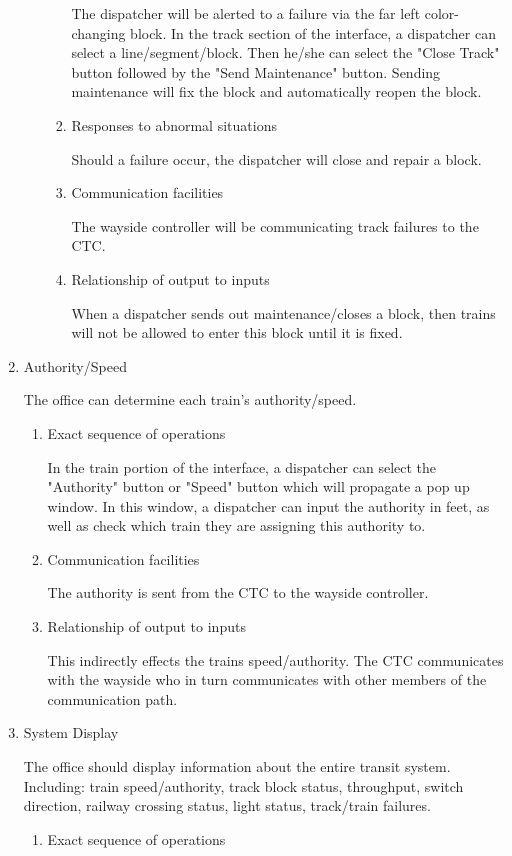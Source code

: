 \documentclass[11pt]{article}
\begin{document}
\begin{enumerate}
\begin{enumerate}
\begin{enumerate}
The dispatcher will be alerted to a failure via the far left color-changing block. In the track section of the interface, a dispatcher can select a line/segment/block. Then he/she can select the "Close Track" button followed by the "Send Maintenance" button. Sending maintenance will fix the block and automatically reopen the block.
\item Responses to abnormal situations
\label{sec-3-1-1-2-1-2}

Should a failure occur, the dispatcher will close and repair a block.
\item Communication facilities
\label{sec-3-1-1-2-1-3}

The wayside controller will be communicating track failures to the CTC.
\item Relationship of output to inputs
\label{sec-3-1-1-2-1-4}

When a dispatcher sends out maintenance/closes a block, then trains will not be allowed to enter this block until it is fixed.
\end{enumerate}
\end{enumerate}
\item Authority/Speed
\label{sec-3-1-1-3}

The office can determine each train's authority/speed.
\begin{enumerate}
\item Exact sequence of operations
\label{sec-3-1-1-3-1}

In the train portion of the interface, a dispatcher can select the "Authority" button or "Speed" button which will propagate a pop up window. In this window, a dispatcher can input the authority in feet, as well as check which train they are assigning this authority to.
\item Communication facilities
\label{sec-3-1-1-3-2}

The authority is sent from the CTC to the wayside controller.
\item Relationship of output to inputs
\label{sec-3-1-1-3-3}

This indirectly effects the trains speed/authority. The CTC communicates with the wayside who in turn communicates with other members of the communication path.
\end{enumerate}
\item System Display
\label{sec-3-1-1-4}

The office should display information about the entire transit system. Including: train speed/authority, track block status, throughput, switch direction, railway crossing status, light status, track/train failures.
\begin{enumerate}
\item Exact sequence of operations
\label{sec-3-1-1-4-1}


\end{enumerate}
\end{enumerate}
\end{document}
